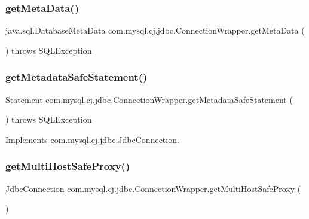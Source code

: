 \subsubsection{\texorpdfstring{get\+Meta\+Data()}{getMetaData()}}
{\footnotesize\ttfamily java.\+sql.\+Database\+Meta\+Data com.\+mysql.\+cj.\+jdbc.\+Connection\+Wrapper.\+get\+Meta\+Data (\begin{DoxyParamCaption}{ }\end{DoxyParamCaption}) throws S\+Q\+L\+Exception}

\mbox{\label{classcom_1_1mysql_1_1cj_1_1jdbc_1_1_connection_wrapper_a33f660f3975110740bea82a04987c017}} 
\subsubsection{\texorpdfstring{get\+Metadata\+Safe\+Statement()}{getMetadataSafeStatement()}}
{\footnotesize\ttfamily Statement com.\+mysql.\+cj.\+jdbc.\+Connection\+Wrapper.\+get\+Metadata\+Safe\+Statement (\begin{DoxyParamCaption}{ }\end{DoxyParamCaption}) throws S\+Q\+L\+Exception}



Implements \mbox{\hyperlink{interfacecom_1_1mysql_1_1cj_1_1jdbc_1_1_jdbc_connection_ab48793a6beae119da08e7ae9e982c6c0}{com.\+mysql.\+cj.\+jdbc.\+Jdbc\+Connection}}.

\mbox{\label{classcom_1_1mysql_1_1cj_1_1jdbc_1_1_connection_wrapper_a8418604a5879f2fd4e820fe438ff0c5a}} 
\subsubsection{\texorpdfstring{get\+Multi\+Host\+Safe\+Proxy()}{getMultiHostSafeProxy()}}
{\footnotesize\ttfamily \mbox{\hyperlink{interfacecom_1_1mysql_1_1cj_1_1jdbc_1_1_jdbc_connection}{Jdbc\+Connection}} com.\+mysql.\+cj.\+jdbc.\+Connection\+Wrapper.\+get\+Multi\+Host\+Safe\+Proxy (\begin{DoxyParamCaption}{ }\end{DoxyParamCaption})}



